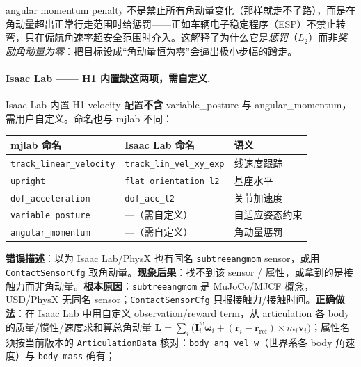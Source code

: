 \begin{insight}\label{ins:rlmc-hl-esp}
angular momentum penalty 不是禁止所有角动量变化（那样就走不了路），而是在角动量超出正常行走范围时给惩罚——正如车辆电子稳定程序（ESP）不禁止转弯，只在偏航角速率超安全范围时介入。这解释了为什么它是\emph{惩罚}（$L_2$）而非\emph{奖励角动量为零}：把目标设成“角动量恒为零”会逼出极小步幅的蹭走。
\end{insight}

\paragraph{Isaac Lab —— H1 内置缺这两项，需自定义.}
Isaac Lab 内置 H1 velocity 配置\textbf{不含} variable\_posture 与 angular\_momentum，需用户自定义。命名也与 mjlab 不同：

\begin{center}
\small
\begin{tabular}{lll}
\hline
mjlab 命名 & Isaac Lab 命名 & 语义 \\
\hline
\texttt{track\_linear\_velocity} & \texttt{track\_lin\_vel\_xy\_exp} & 线速度跟踪 \\
\texttt{upright} & \texttt{flat\_orientation\_l2} & 基座水平 \\
\texttt{dof\_acceleration} & \texttt{dof\_acc\_l2} & 关节加速度 \\
\texttt{variable\_posture} & ---（需自定义） & 自适应姿态约束 \\
\texttt{angular\_momentum} & ---（需自定义） & 角动量惩罚 \\
\hline
\end{tabular}
\end{center}

\begin{pitfall}
\textbf{错误描述}：以为 Isaac Lab/PhysX 也有同名 \texttt{subtreeangmom} sensor，或用 \texttt{ContactSensorCfg} 取角动量。\textbf{现象后果}：找不到该 sensor / 属性，或拿到的是接触力而非角动量。\textbf{根本原因}：\texttt{subtreeangmom} 是 MuJoCo/MJCF 概念，USD/PhysX 无同名 sensor；\texttt{ContactSensorCfg} 只报接触力/接触时间。\textbf{正确做法}：在 Isaac Lab 中用自定义 observation/reward term，从 articulation 各 body 的质量/惯性/速度求和算总角动量 $\mathbf{L}=\sum_i\big(\mathbf{I}_i^{w}\boldsymbol\omega_i+(\mathbf{r}_i-\mathbf{r}_{\mathrm{ref}})\times m_i\mathbf{v}_i\big)$；属性名须按当前版本的 \texttt{ArticulationData} 核对：\texttt{body\_ang\_vel\_w}（世界系各 body 角速度）与 \texttt{body\_mass} 确有；
\end{pitfall}

